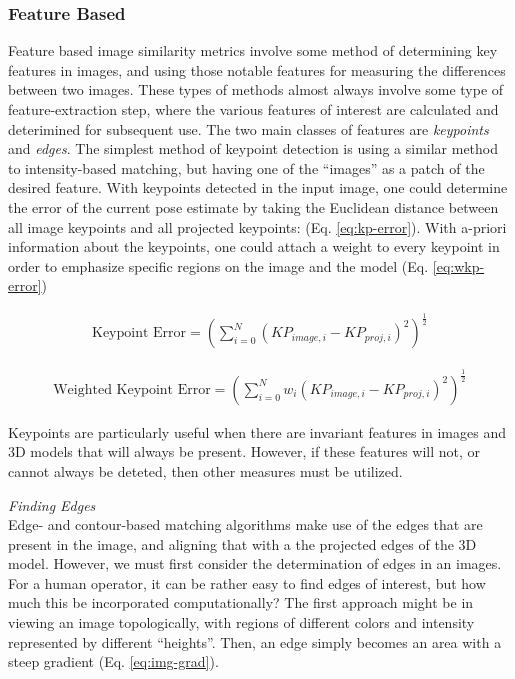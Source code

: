 \subsubsection{Feature Based}
\label{sec:img-sim-feature}
Feature based image similarity metrics involve some method of determining key features in images, and using those notable features for measuring the differences between two images. These types of methods almost always involve some type of feature-extraction step, where the various features of interest are calculated and deterimined for subsequent use. The two main classes of features are \emph{keypoints} and \emph{edges}. The simplest method of keypoint detection is using a similar method to intensity-based matching, but having one of the ``images'' as a patch of the desired feature. With keypoints detected in the input image, one could determine the error of the current pose estimate by taking the Euclidean distance between all image keypoints and all projected keypoints: \cite{burtonAutomaticTrackingHealthy2021} (Eq. \ref{eq:kp-error}). With a-priori information about the keypoints, one could attach a weight to every keypoint in order to emphasize specific regions on the image and the model (Eq. \ref{eq:wkp-error})

\begin{equation}
    \begin{aligned}
        \text{Keypoint Error}= (\sum_{i = 0}^{N}(KP_{image,i} - KP_{proj,i})^2)^{\frac{1}{2}}
    \end{aligned}
    \label{eq:kp-error}
\end{equation}

\begin{equation}
    \begin{aligned}
        \text{Weighted Keypoint Error} = (\sum_{i = 0}^{N}w_{i}(KP_{image,i} - KP_{proj,i})^2)^{\frac{1}{2}}
    \end{aligned}
    \label{eq:wkp-error}
\end{equation}

Keypoints are particularly useful when there are invariant features in images and 3D models that will always be present. However, if these features will not, or cannot always be deteted, then other measures must be utilized.

\emph{Finding Edges}\\
Edge- and contour-based matching algorithms make use of the edges that are present in the image, and aligning that with a the projected edges of the 3D model. However, we must first consider the determination of edges in an images. For a human operator, it can be rather easy to find edges of interest, but how much this be incorporated computationally? The first approach might be in viewing an image topologically, with regions of different colors and intensity represented by different ``heights''. Then, an edge simply becomes an area with a steep gradient (Eq. \ref{eq:img-grad}).

